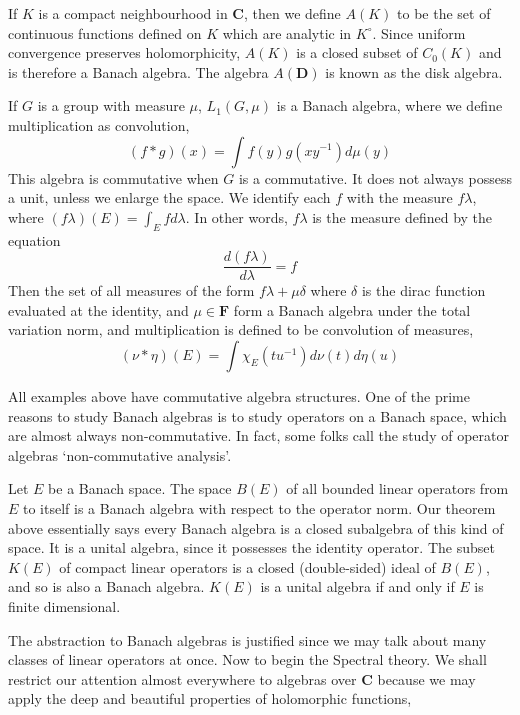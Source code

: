 \begin{example}
    If $K$ is a compact neighbourhood in $\mathbf{C}$, then we define $A(K)$ to be the set of continuous functions defined on $K$ which are analytic in $K^\circ$. Since uniform convergence preserves holomorphicity, $A(K)$ is a closed subset of $C_0(K)$ and is therefore a Banach algebra. The algebra $A(\mathbf{D})$ is known as the disk algebra.
\end{example}

\begin{example}
    If $G$ is a group with measure $\mu$, $L_1(G, \mu)$ is a Banach algebra, where we define multiplication as convolution,
    \[ (f * g)(x) = \int f(y) g(xy^{-1}) d\mu(y) \]
    This algebra is commutative when $G$ is a commutative. It does not always possess a unit, unless we enlarge the space. We identify each $f$ with the measure $f \lambda$, where $(f \lambda) (E) = \int_E f d\lambda$. In other words, $f \lambda$ is the measure defined by the equation
    \[ \frac{d(f \lambda)}{d \lambda} = f \]
    Then the set of all measures of the form $f \lambda + \mu \delta$ where $\delta$ is the dirac function evaluated at the identity, and $\mu \in \mathbf{F}$ form a Banach algebra under the total variation norm, and multiplication is defined to be convolution of measures,
    \[ (\nu * \eta)(E) = \int \chi_E (tu^{-1}) d \nu(t) d\eta(u) \]
\end{example}

All examples above have commutative algebra structures. One of the prime reasons to study Banach algebras is to study operators on a Banach space, which are almost always non-commutative. In fact, some folks call the study of operator algebras `non-commutative analysis'.

\begin{example}
    Let $E$ be a Banach space. The space $B(E)$ of all bounded linear operators from $E$ to itself is a Banach algebra with respect to the operator norm. Our theorem above essentially says every Banach algebra is a closed subalgebra of this kind of space. It is a unital algebra, since it possesses the identity operator. The subset $K(E)$ of compact linear operators is a closed (double-sided) ideal of $B(E)$, and so is also a Banach algebra. $K(E)$ is a unital algebra if and only if $E$ is finite dimensional.
\end{example}

The abstraction to Banach algebras is justified since we may talk about many classes of linear operators at once. Now to begin the Spectral theory. We shall restrict our attention almost everywhere to algebras over $\mathbf{C}$ because we may apply the deep and beautiful properties of holomorphic functions,

